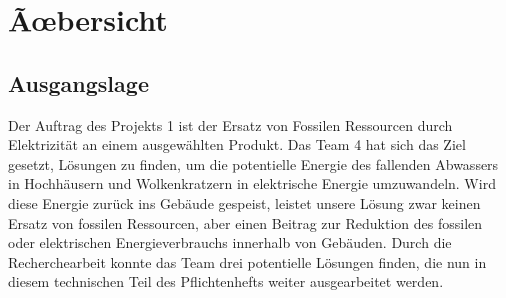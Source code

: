 \section{Ãœbersicht} \label{sec:uebersicht}
\subsection{Ausgangslage}
Der Auftrag des Projekts 1 ist der Ersatz von Fossilen Ressourcen durch Elektrizität an einem ausgewählten Produkt. Das Team 4 hat sich das Ziel gesetzt, Lösungen zu finden, um die potentielle Energie des fallenden Abwassers in Hochhäusern und Wolkenkratzern in elektrische Energie umzuwandeln. Wird diese Energie zurück ins Gebäude gespeist, leistet unsere Lösung zwar keinen Ersatz von fossilen Ressourcen, aber einen Beitrag zur Reduktion des fossilen oder elektrischen Energieverbrauchs innerhalb von Gebäuden.
Durch die Recherchearbeit konnte das Team drei potentielle Lösungen finden, die nun in diesem technischen Teil des Pflichtenhefts weiter ausgearbeitet werden.
\renewcommand\arraystretch{1.5}

